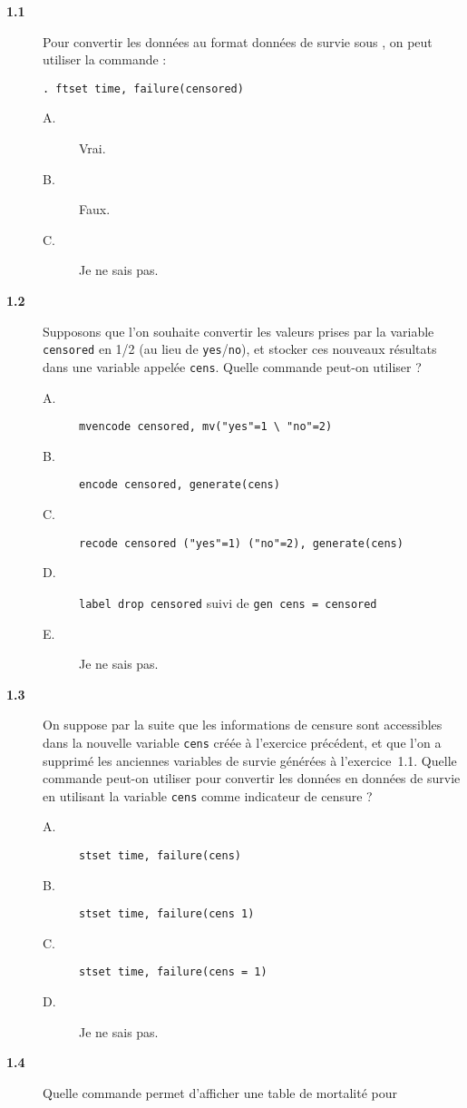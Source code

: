 \begin{description}
\item[\bf 1.1] Pour convertir les données au format données de survie sous
  \Stata, on peut utiliser la commande : 
\begin{verbatim}
. ftset time, failure(censored)
\end{verbatim}
\begin{description}
\item[A.] Vrai.
\item[B.] Faux.
\item[C.] Je ne sais pas.
\end{description}
\item[\bf 1.2] Supposons que l'on souhaite convertir les valeurs prises par
  la variable \texttt{censored} en 1/2 (au lieu de
  \texttt{yes}/\texttt{no}), et stocker ces nouveaux résultats dans une
  variable appelée \texttt{cens}. Quelle commande peut-on utiliser ?
\begin{description}
\item[A.] \verb|mvencode censored, mv("yes"=1 \ "no"=2)|
\item[B.] \verb|encode censored, generate(cens)|
\item[C.] \verb|recode censored ("yes"=1) ("no"=2), generate(cens)|
\item[D.] \verb|label drop censored| suivi de \verb|gen cens = censored|
\item[E.] Je ne sais pas.
\end{description}
\item[\bf 1.3] On suppose par la suite que les informations de censure sont
  accessibles dans la nouvelle variable \texttt{cens} créée à l'exercice
  précédent, et que l'on a supprimé les anciennes variables de survie
  générées à l'exercice~1.1. Quelle commande peut-on utiliser pour convertir
  les données en données de survie en utilisant la variable \texttt{cens}
  comme indicateur de censure ?  
\begin{description}
\item[A.] \verb|stset time, failure(cens)|
\item[B.] \verb|stset time, failure(cens 1)|
\item[C.] \verb|stset time, failure(cens = 1)|
\item[D.] Je ne sais pas.
\end{description}
\item[\bf 1.4] Quelle commande permet d'afficher une table de mortalité pour

\end{description}
